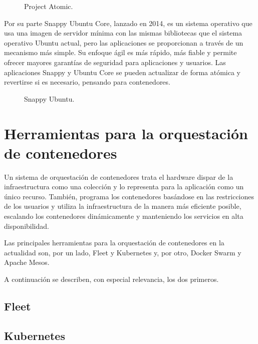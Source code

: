 \begin{figure}[H]
\caption{Project Atomic.\label{fig:figure_placement_example}}
\end{figure}

Por su parte Snappy Ubuntu Core, lanzado en 2014, es un sistema operativo que usa una imagen de servidor mínima con las mismas bibliotecas que el sistema operativo Ubuntu actual, pero las aplicaciones se proporcionan a través de un mecanismo más simple. Su enfoque ágil es más rápido, más fiable y permite ofrecer mayores garantías de seguridad para aplicaciones y usuarios. Las aplicaciones Snappy y Ubuntu Core se pueden actualizar de forma atómica y revertirse si es necesario, pensando para contenedores.

\begin{figure}[H]
\caption{Snappy Ubuntu.\label{fig:figure_placement_example}}
\end{figure}

\section{Herramientas para la orquestación de contenedores}

Un sistema de orquestación de contenedores trata el hardware dispar de la infraestructura como una colección y lo representa para la aplicación como un único recurso. También, programa los contenedores basándose en las restricciones de los usuarios y utiliza la infraestructura de la manera más eficiente posible, escalando los contenedores dinámicamente y manteniendo los servicios en alta disponibilidad.

Las principales herramientas para la orquestación de contenedores en la actualidad son, por un lado, Fleet y Kubernetes y, por otro, Docker Swarm y Apache Mesos.

A continuación se describen, con especial relevancia, los dos primeros.

\subsection{Fleet}

\subsection{Kubernetes}

